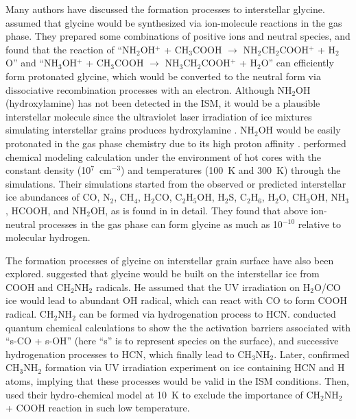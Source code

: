 \documentclass{aastex61}
\begin{document}
Many authors have discussed the formation processes to interstellar glycine.
%
\cite{Blagojevic03} assumed that glycine would be synthesized via ion-molecule reactions in the gas phase.
%
They prepared some combinations of positive ions and neutral species, and found that the reaction of ``NH$_{2}$OH$^+$ + CH$_3$COOH $\longrightarrow$ NH$_{2}$CH$_2$COOH$^+$ + H$_2$O'' and ``NH$_{3}$OH$^+$ + CH$_3$COOH $\longrightarrow$ NH$_{3}$CH$_2$COOH$^+$ + H$_2$O'' can efficiently form protonated glycine, which would be converted to the neutral form via dissociative recombination processes with an electron.
%
Although NH$_2$OH (hydroxylamine) has not been detected in the ISM, it would be a plausible interstellar molecule since the ultraviolet laser irradiation of ice mixtures simulating interstellar grains produces hydroxylamine \citep{Nishi84}.
%
NH$_2$OH would be easily protonated in the gas phase chemistry due to its high proton affinity \citep{Blagojevic03}. 
%
\cite{Charnley06} performed chemical modeling calculation under the environment of hot cores with the constant density (10$^7$~cm$^{-3}$) and temperatures (100~K and 300~K) through the simulations.
%
Their simulations started from the observed or predicted interstellar ice abundances of CO, N$_2$, CH$_4$, H$_2$CO, C$_2$H$_5$OH, H$_2$S, C$_2$H$_6$, H$_2$O, CH$_3$OH, NH$_3$, HCOOH, and NH$_2$OH, as is found in \cite{Rodgers01} in detail.
%
They found that above ion-neutral processes in the gas phase can form glycine as much as 10$^{-10}$ relative to molecular hydrogen.
%


The formation processes of glycine on interstellar grain surface have also been explored.
%
\cite{Woon02} suggested that glycine would be built on the interstellar ice from COOH and CH$_2$NH$_2$ radicals.
%
He assumed that the UV irradiation on H$_2$O/CO ice would lead to abundant OH radical, which can react with CO to form COOH radical.
%
CH$_2$NH$_2$ can be formed via hydrogenation process to HCN.
%
\cite{Woon02} conducted quantum chemical calculations to show the the activation barriers associated with ``s-CO + s-OH''  (here ``s'' is to represent species on the surface), and successive hydrogenation processes to HCN, which finally lead to CH$_3$NH$_2$. Later, \cite{Theule11} confirmed CH$_3$NH$_2$ formation via UV 
irradiation experiment on ice containing HCN and H atoms, implying that these processes would be valid in the ISM conditions.
%
%
Then, \cite{Majumdar13} used their hydro-chemical model at 10~K to exclude the importance of CH$_2$NH$_2$ + COOH reaction in such low temperature.
%
%
\end{document}
